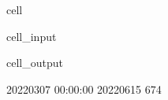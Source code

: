 \documentclass[letterpaper,10pt,english]{jupyterBook}
\begin{document}
\begin{sphinxuseclass}{cell}\begin{sphinxVerbatimInput}

\begin{sphinxuseclass}{cell_input}
\begin{sphinxVerbatim}[commandchars=\\\{\}]
  
\end{sphinxVerbatim}

\end{sphinxuseclass}\end{sphinxVerbatimInput}
\begin{sphinxVerbatimOutput}

\begin{sphinxuseclass}{cell_output}
\begin{sphinxVerbatim}[commandchars=\\\{\}]
2022\PYGZhy{}03\PYGZhy{}07 00:00:00 2022\PYGZhy{}06\PYGZhy{}15
674
\end{sphinxVerbatim}


\end{sphinxuseclass}
\end{sphinxVerbatimOutput}
\end{sphinxuseclass}
\end{document}
